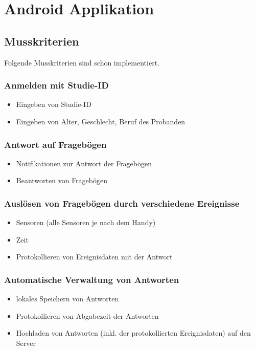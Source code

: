 \documentclass[a4paper]{scrreprt}
\begin{document}
        \section{Android Applikation}
        \subsection{Musskriterien}
        \par
        Folgende Musskriterien sind schon implementiert.
                \subsubsection{Anmelden mit Studie-ID}
                    \begin{itemize}
                        \item Eingeben von Studie-ID
                        \item Eingeben von Alter, Geschlecht, Beruf des Probanden
                    \end{itemize}
                \subsubsection{Antwort auf Frageb\"ogen}
                    \begin{itemize}
                        \item Notifikationen zur Antwort der Frageb\"ogen
                        \item Beantworten von Frageb\"ogen
                    \end{itemize}
                \subsubsection{Auslösen von Frageb\"ogen durch verschiedene Ereignisse}
                    \begin{itemize}
                        \item Sensoren (alle Sensoren je nach dem Handy)
                        \item Zeit
                        \item Protokollieren von Ereignisdaten mit der Antwort
                    \end{itemize}
                \subsubsection{Automatische Verwaltung von Antworten}
                    \begin{itemize}
                        \item lokales Speichern von Antworten
                        \item Protokollieren von Abgabezeit der Antworten
                        \item Hochladen von Antworten (inkl. der protokollierten Ereignisdaten) auf den Server
                    \end{itemize}
                \vspace*{0.5cm}
\end{document}
